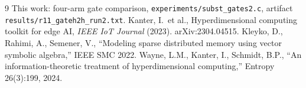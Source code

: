 \documentclass[10pt,twocolumn]{article}
\begin{document}
{\small}
\begin{thebibliography}{9}\small
{} This work: four-arm gate comparison, \texttt{experiments/subst\_gates2.c}, artifact \texttt{results/r11\_gateh2h\_run2.txt}.
 Kanter, I.~et al., Hyperdimensional computing toolkit for edge AI, \textit{IEEE IoT Journal} (2023). arXiv:2304.04515.
 Kleyko, D., Rahimi, A., Semener, V., ``Modeling sparse distributed memory using vector symbolic algebra,'' IEEE SMC 2022.
 Wayne, L.M., Kanter, I., Schmidt, B.P., ``An information-theoretic treatment of hyperdimensional computing,'' Entropy 26(3):199, 2024.
\end{thebibliography}
\end{document}
